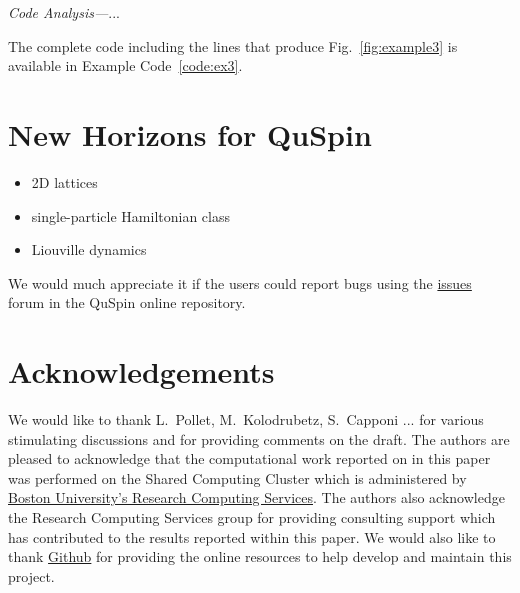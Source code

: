 \documentclass{SciPost}
\newcommand\0{\scalebox{-1}[1]{0}}
\newcommand{\Spincode}{example7.py}
\begin{document}
\noindent\emph{Code Analysis---}...


The complete code including the lines that produce Fig.~\ref{fig:example3} is available in Example Code~\ref{code:ex3}.



\section{New Horizons for QuSpin}
\label{sec:outro}

\begin{itemize}
	\item 2D lattices
	\item single-particle Hamiltonian class
	\item Liouville dynamics
\end{itemize}
 

We would much appreciate it if the users could report bugs using the \href{https://github.com/weinbe58/qspin/issues}{issues} forum in the QuSpin online repository.


\section*{Acknowledgements}
We would like to thank L.~Pollet, M.~Kolodrubetz, S.~Capponi ... for various stimulating discussions and for providing comments on the draft. The authors are pleased to acknowledge that the computational work reported on in this paper was performed on the Shared Computing Cluster which is administered by \href{http://www.bu.edu/tech/support/research/}{Boston University's Research Computing Services}. The authors also acknowledge the Research Computing Services group for providing consulting support which has contributed to the results reported within this paper. We would also like to thank \href{https://github.com/}{Github} for providing the online resources to help develop and maintain this project. 

\end{document}
